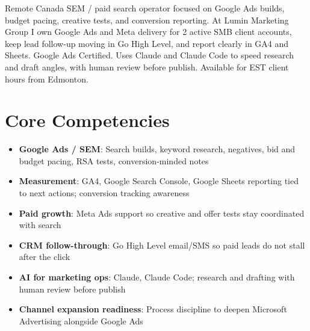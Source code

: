 \documentclass[11pt,a4paper,sans]{moderncv}
\begin{document}
\makecvtitle

\vspace{6pt}
\small{Remote Canada SEM / paid search operator focused on Google Ads builds, budget pacing, creative tests, and conversion reporting. At Lumin Marketing Group I own Google Ads and Meta delivery for 2 active SMB client accounts, keep lead follow-up moving in Go High Level, and report clearly in GA4 and Sheets. Google Ads Certified. Uses Claude and Claude Code to speed research and draft angles, with human review before publish. Available for EST client hours from Edmonton.}

\section{Core Competencies}
\vspace{1pt}
\begin{itemize}
\item \textbf{Google Ads / SEM}: Search builds, keyword research, negatives, bid and budget pacing, RSA tests, conversion-minded notes
\item \textbf{Measurement}: GA4, Google Search Console, Google Sheets reporting tied to next actions; conversion tracking awareness
\item \textbf{Paid growth}: Meta Ads support so creative and offer tests stay coordinated with search
\item \textbf{CRM follow-through}: Go High Level email/SMS so paid leads do not stall after the click
\item \textbf{AI for marketing ops}: Claude, Claude Code; research and drafting with human review before publish
\item \textbf{Channel expansion readiness}: Process discipline to deepen Microsoft Advertising alongside Google Ads
\end{itemize}
\end{document}
